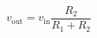 \documentclass{standalone}
\begin{document}
  \begin{equation*}
	v_\text{out}=v_\text{in}\frac{R_2}{R_1+R_2}
	\end{equation*}
\end{document}
